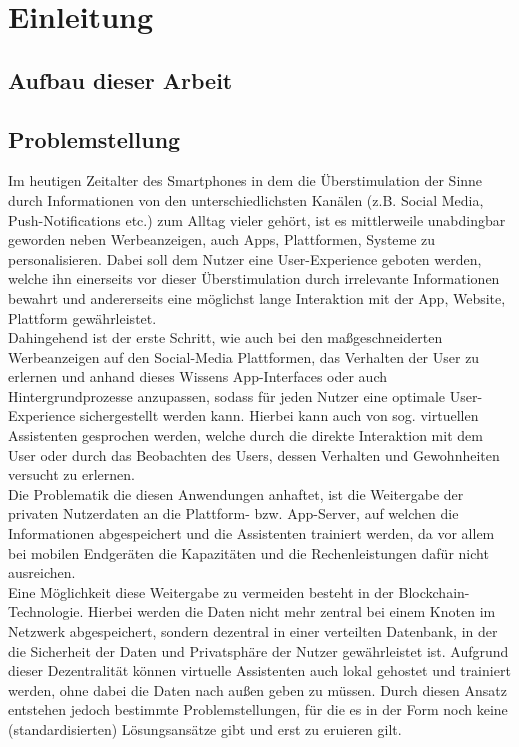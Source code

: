 \chapter{Einleitung}
\label{kap:Kapitel01}
%
      
%
\section{Aufbau dieser Arbeit}
%
 
%
\section{Problemstellung}
Im heutigen Zeitalter des Smartphones in dem die Überstimulation \cite{SMPUse} der Sinne durch Informationen von den unterschiedlichsten Kanälen (z.B. Social Media, Push-Notifications etc.) zum Alltag vieler gehört, ist es mittlerweile unabdingbar geworden neben Werbeanzeigen, auch Apps, Plattformen, Systeme zu personalisieren. Dabei soll dem Nutzer eine User-Experience geboten werden, welche ihn einerseits vor dieser Überstimulation durch irrelevante Informationen bewahrt und andererseits eine möglichst lange Interaktion mit der App, Website, Plattform gewährleistet. \\
Dahingehend ist der erste Schritt, wie auch bei den maßgeschneiderten Werbeanzeigen auf den Social-Media Plattformen, das Verhalten der User zu erlernen und anhand dieses Wissens App-Interfaces oder auch Hintergrundprozesse anzupassen, sodass für jeden Nutzer eine optimale User-Experience sichergestellt werden kann. Hierbei kann auch von sog. virtuellen Assistenten gesprochen werden, welche durch die direkte Interaktion mit dem User oder durch das Beobachten des Users, dessen Verhalten und Gewohnheiten versucht zu erlernen. \\
Die Problematik die diesen Anwendungen anhaftet, ist die Weitergabe der privaten Nutzerdaten an die Plattform- bzw. App-Server, auf welchen die Informationen abgespeichert und die Assistenten trainiert werden, da vor allem bei mobilen Endgeräten die Kapazitäten und die Rechenleistungen dafür nicht ausreichen. \\
Eine Möglichkeit diese Weitergabe zu vermeiden besteht in der Blockchain-Technologie. Hierbei werden die Daten nicht mehr zentral bei einem Knoten im Netzwerk abgespeichert, sondern dezentral in einer verteilten Datenbank, in der die Sicherheit der Daten und Privatsphäre der Nutzer gewährleistet ist. Aufgrund dieser Dezentralität können virtuelle Assistenten auch lokal gehostet und trainiert werden, ohne dabei die Daten nach außen geben zu müssen. Durch diesen Ansatz entstehen jedoch bestimmte Problemstellungen, für die es in der Form noch keine (standardisierten) Lösungsansätze gibt und erst zu eruieren gilt. \\
